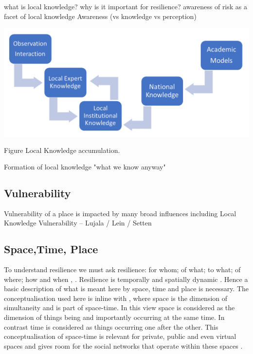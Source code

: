 \documentclass{article}
\begin{document}
what is local knowledge?
why is it important for resilience?
awareness of risk as a facet of local knowledge 
 Awareness (vs knowledge vs perception)

\includegraphics[width=1\textwidth]{fig_theory/local knowledge accumulation.png}

\begin{frame}{Figure Local Knowledge accumulation.}
\end{frame}


Formation of local knowledge "what we know anyway" \cite{setten_we_2019}
 
\subsection{Vulnerability}
Vulnerability of a place is impacted by many broad influences including Local Knowledge 
Vulnerability – Lujala / Lein / Setten 



\subsection{Space,Time, Place} 
To understand resilience we must ask resilience: for whom; of what; to what; of where; how and when \cite{cutter_community_2020}, \cite{moser_turbulent_2019}. Resilience is temporally and spatially dynamic \cite{cutter_community_2020}. Hence a basic description of what is meant here by space, time and place is necessary. The conceptualisation used here is inline with \cite{massey_for_2005}, where space is the dimension of simultaneity and is part of space-time. In this view space is considered as the dimension of things being and importantly occurring at the same time. In contrast time is considered as things occurring one after the other. This conceptualisation of space-time is relevant for private, public and even virtual spaces and gives room for the social networks that operate within these spaces \cite{massey_for_2005} \cite{allen_rethinking_1998}.
\end{document}
